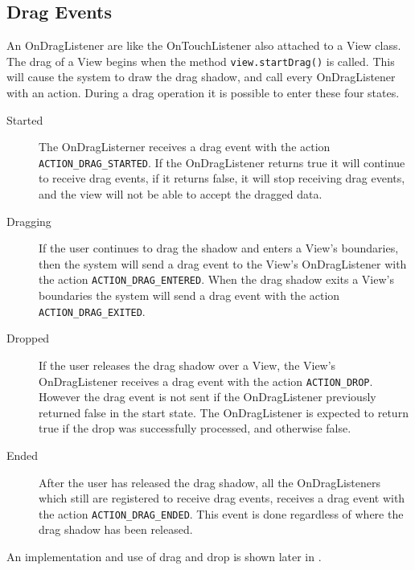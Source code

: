 \subsection*{Drag Events}
An OnDragListener are like the OnTouchListener also attached to a View class. The drag of a View begins when the method \lstinline|view.startDrag()| is called. This will cause the system to draw the drag shadow, and call every OnDragListener with an action. During a drag operation it is possible to enter these four states.
\begin{description}
\item[Started] The OnDragListerner receives a drag event with the action \lstinline|ACTION_DRAG_STARTED|. If the OnDragListener returns true it will continue to receive drag events, if it returns false, it will stop receiving drag events, and the view will not be able to accept the dragged data.

\item[Dragging] If the user continues to drag the shadow and enters a View's boundaries, then the system will send a drag event to the View's OnDragListener with the action \lstinline|ACTION_DRAG_ENTERED|. When the drag shadow exits a View's boundaries the system will send a drag event with the action \lstinline|ACTION_DRAG_EXITED|.

\item[Dropped] If the user releases the drag shadow over a View, the View's OnDragListener receives a drag event with the action \lstinline|ACTION_DROP|. However the drag event is not sent if the OnDragListener previously returned false in the start state. The OnDragListener is expected to return true if the drop was successfully processed, and otherwise false.

\item[Ended] After the user has released the drag shadow, all the OnDragListeners which still are registered to receive drag events, receives a drag event with the action \lstinline|ACTION_DRAG_ENDED|. This event is done regardless of where the drag shadow has been released.
\end{description}
An implementation and use of drag and drop is shown later in .

